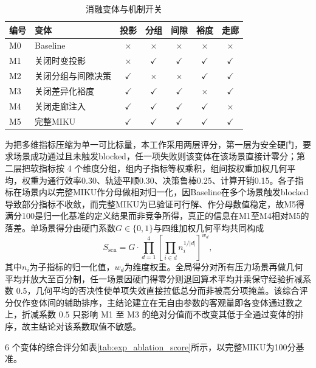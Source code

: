 \documentclass[a4paper,zihao=5]{ctexart}
\theoremstyle{definition}
\begin{document}
\begin{table}[htbp]
\centering
\caption{消融变体与机制开关}
\label{tab:exp_ablation_matrix}
\small
\begin{tabular}{llccccc}
\toprule
\textbf{编号} & \textbf{变体} & 投影 & 分组 & 间隙 & 裕度 & 走廊 \\
\midrule
M0 & Baseline             & $\times$    & $\times$    & $\times$    & $\times$    & $\times$    \\
M1 & 关闭时变投影         & $\times$    & $\checkmark$ & $\checkmark$ & $\checkmark$ & $\checkmark$ \\
M2 & 关闭分组与间隙决策   & $\checkmark$ & $\times$    & $\times$    & $\checkmark$ & $\checkmark$ \\
M3 & 关闭差异化裕度       & $\checkmark$ & $\checkmark$ & $\checkmark$ & $\times$    & $\checkmark$ \\
M4 & 关闭走廊注入         & $\checkmark$ & $\checkmark$ & $\checkmark$ & $\checkmark$ & $\times$    \\
M5 & 完整MIKU             & $\checkmark$ & $\checkmark$ & $\checkmark$ & $\checkmark$ & $\checkmark$ \\
\bottomrule
\end{tabular}
\end{table}

为把多维指标压缩为单一可比标量，本工作采用两层评分，第一层为安全硬门，要求场景成功通过且未触发blocked，任一项失败则该变体在该场景直接计零分；第二层把软指标按 4 个维度分组，组内子指标等权乘积，组间按权重加权几何平均，权重为通行效率0.30、轨迹平顺0.30、决策鲁棒0.25、计算开销0.15。各子指标在场景内以完整MIKU作分母做相对归一化，因Baseline在多个场景触发blocked导致部分指标不收敛，而完整MIKU为已验证可行解、作分母数值稳定，故M5得满分100是归一化基准的定义结果而非竞争所得，真正的信息在M1至M4相对M5的落差。单场景得分由硬门系数$G \in \{0, 1\}$与四维加权几何平均共同构成
\begin{equation}
S_{\mathrm{scn}} = G \cdot \prod_{d=1}^{4} \left[ \prod_{i \in d} n_i^{1/|d|} \right]^{w_d},
\label{eq:exp_score_scn}
\end{equation}
其中$n_i$为子指标的归一化值，$w_d$为维度权重。全局得分对所有压力场景再做几何平均并放大至百分制，任一场景因硬门得零分则退回算术平均并乘保守经验折减系数 $0.5$，几何平均的否决性使单项失效直接拉低总分而非被高分项掩盖。该综合评分仅作变体间的辅助排序，主结论建立在无自由参数的客观量即各变体通过数之上，折减系数 $0.5$ 只影响 M1 至 M3 的绝对分值而不改变其低于全通过变体的排序，故主结论对该系数取值不敏感。

6 个变体的综合评分如表\ref{tab:exp_ablation_score}所示，以完整MIKU为100分基准。
\end{document}
